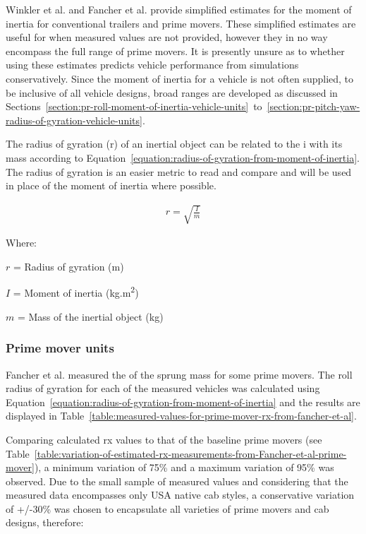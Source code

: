 Winkler et al. \cite{Winkler2011} and Fancher et al. \cite{Fancher1986} provide simplified estimates for the moment of inertia for conventional trailers and prime movers. These simplified estimates are useful for when measured values are not provided, however they in no way encompass the full range of prime movers. It is presently unsure as to whether using these estimates predicts vehicle performance from simulations conservatively. Since the moment of inertia for a vehicle is not often supplied, to be inclusive of all vehicle designs, broad ranges are developed as discussed in Sections~\ref{section:pr-roll-moment-of-inertia-vehicle-units}~to~\ref{section:pr-pitch-yaw-radius-of-gyration-vehicle-units}.

The radius of gyration (\gls{r}) of an inertial object can be related to the \gls{i} with its mass according to Equation~\ref{equation:radius-of-gyration-from-moment-of-inertia}. The radius of gyration is an easier metric to read and compare and will be used in place of the moment of inertia where possible.

\begin{align}
	\label{equation:radius-of-gyration-from-moment-of-inertia}
	r = \sqrt{\frac{I}{m}}
\end{align}

Where:

$r$ = Radius of gyration (m)

$I$ = Moment of inertia (kg.m\textsuperscript{2})

$m$ = Mass of the inertial object (kg)

\subsubsection{Prime mover units}\label{section:pr-roll-moment-of-inertia-prime-mover-vehicle-units}

Fancher et al. \cite{Fancher1986} measured the  of the sprung mass for some prime movers. The roll radius of gyration for each of the measured vehicles was calculated using Equation~\ref{equation:radius-of-gyration-from-moment-of-inertia} and the results are displayed in Table~\ref{table:measured-values-for-prime-mover-rx-from-fancher-et-al}.

Comparing calculated \gls{rx} values to that of the baseline prime movers (see Table~\ref{table:variation-of-estimated-rx-measurements-from-Fancher-et-al-prime-mover}), a minimum variation of 75\% and a maximum variation of 95\% was observed. Due to the small sample of measured values and considering that the measured data encompasses only USA native cab styles, a conservative variation of +/-30\% was chosen to encapsulate all varieties of prime movers and cab designs, therefore:

